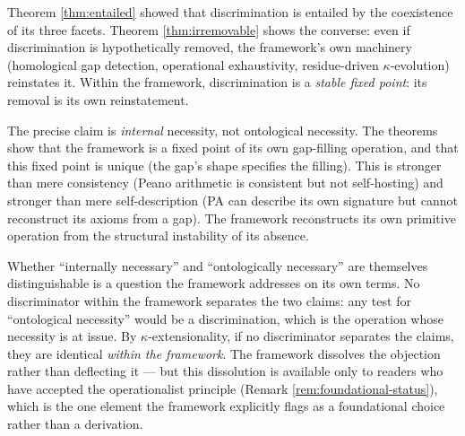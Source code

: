 \begin{remark}
Theorem \ref{thm:entailed} showed that discrimination
is entailed by the coexistence of its three facets.
Theorem \ref{thm:irremovable} shows the converse: even
if discrimination is hypothetically removed, the
framework's own machinery (homological gap detection,
operational exhaustivity, residue-driven $\kappa$-evolution)
reinstates it. Within the framework, discrimination is
a \emph{stable fixed point}: its removal is its own
reinstatement.

The precise claim is \emph{internal} necessity, not
ontological necessity. The theorems show that the
framework is a fixed point of its own gap-filling
operation, and that this fixed point is unique (the
gap's shape specifies the filling). This is stronger
than mere consistency (Peano arithmetic is consistent but
not self-hosting) and stronger than mere self-description
(PA can describe its own signature but cannot reconstruct
its axioms from a gap). The framework reconstructs its
own primitive operation from the structural instability
of its absence.

Whether ``internally necessary'' and ``ontologically
necessary'' are themselves distinguishable is a question
the framework addresses on its own terms. No
discriminator within the framework separates the two
claims: any test for ``ontological necessity'' would be a
discrimination, which is the operation whose necessity is
at issue. By $\kappa$-extensionality, if no discriminator
separates the claims, they are identical \emph{within the
framework}. The framework dissolves the objection rather
than deflecting it --- but this dissolution is available
only to readers who have accepted the operationalist
principle (Remark \ref{rem:foundational-status}), which
is the one element the framework explicitly flags as a
foundational choice rather than a derivation.
\end{remark}

